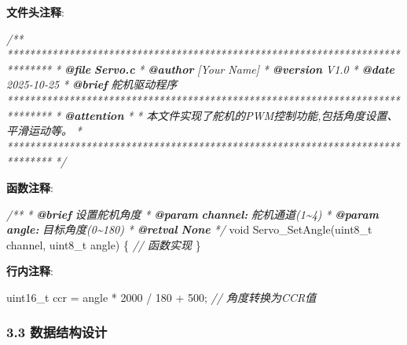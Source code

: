 \documentclass[
]{article}
\newenvironment{Shaded}{}{}
\newcommand{\AnnotationTok}[1]{\textcolor[rgb]{0.38,0.63,0.69}{\textbf{\textit{#1}}}}
\newcommand{\CommentTok}[1]{\textcolor[rgb]{0.38,0.63,0.69}{\textit{#1}}}
\newcommand{\CommentVarTok}[1]{\textcolor[rgb]{0.38,0.63,0.69}{\textbf{\textit{#1}}}}
\newcommand{\DataTypeTok}[1]{\textcolor[rgb]{0.56,0.13,0.00}{#1}}
\newcommand{\DecValTok}[1]{\textcolor[rgb]{0.25,0.63,0.44}{#1}}
\newcommand{\NormalTok}[1]{#1}
\begin{document}
\textbf{文件头注释}:

\begin{Shaded}
\begin{Highlighting}[]
\CommentTok{/**}
\CommentTok{  ******************************************************************************}
\CommentTok{  * }\AnnotationTok{@file}\CommentTok{    }\CommentVarTok{Servo.c}
\CommentTok{  * }\AnnotationTok{@author}\CommentTok{  [Your Name]}
\CommentTok{  * }\AnnotationTok{@version}\CommentTok{ V1.0}
\CommentTok{  * }\AnnotationTok{@date}\CommentTok{    2025{-}10{-}25}
\CommentTok{  * }\AnnotationTok{@brief}\CommentTok{   舵机驱动程序}
\CommentTok{  ******************************************************************************}
\CommentTok{  * }\AnnotationTok{@attention}
\CommentTok{  *}
\CommentTok{  * 本文件实现了舵机的PWM控制功能,包括角度设置、平滑运动等。}
\CommentTok{  *}
\CommentTok{  ******************************************************************************}
\CommentTok{  */}
\end{Highlighting}
\end{Shaded}

\textbf{函数注释}:

\begin{Shaded}
\begin{Highlighting}[]
\CommentTok{/**}
\CommentTok{  * }\AnnotationTok{@brief}\CommentTok{  设置舵机角度}
\CommentTok{  * }\AnnotationTok{@param}\CommentTok{  }\CommentVarTok{channel:}\CommentTok{ 舵机通道(1\textasciitilde{}4)}
\CommentTok{  * }\AnnotationTok{@param}\CommentTok{  }\CommentVarTok{angle:}\CommentTok{ 目标角度(0\textasciitilde{}180)}
\CommentTok{  * }\AnnotationTok{@retval}\CommentTok{ }\CommentVarTok{None}
\CommentTok{  */}
\DataTypeTok{void}\NormalTok{ Servo\_SetAngle(}\DataTypeTok{uint8\_t}\NormalTok{ channel, }\DataTypeTok{uint8\_t}\NormalTok{ angle)}
\NormalTok{\{}
    \CommentTok{// 函数实现}
\NormalTok{\}}
\end{Highlighting}
\end{Shaded}

\textbf{行内注释}:

\begin{Shaded}
\begin{Highlighting}[]
\DataTypeTok{uint16\_t}\NormalTok{ ccr = angle * }\DecValTok{2000}\NormalTok{ / }\DecValTok{180}\NormalTok{ + }\DecValTok{500}\NormalTok{;  }\CommentTok{// 角度转换为CCR值}
\end{Highlighting}
\end{Shaded}

\hypertarget{ux6570ux636eux7ed3ux6784ux8bbeux8ba1}{%
\subsubsection{3.3
数据结构设计}\label{ux6570ux636eux7ed3ux6784ux8bbeux8ba1}}
\end{document}
